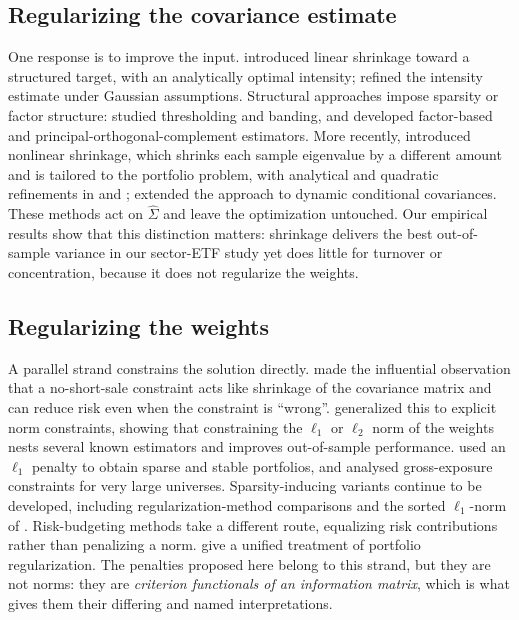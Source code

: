 \documentclass[11pt]{article}
\newcommand{\Sighat}{\hat\Sigma}
\begin{document}
\subsection{Regularizing the covariance estimate}
One response is to improve the input. \citet{ledoitwolf2003,ledoitwolf2004}
introduced linear shrinkage toward a structured target, with an analytically
optimal intensity; \citet{chen2010oas} refined the intensity estimate under
Gaussian assumptions. Structural approaches impose sparsity or factor structure:
\citet{bickel2008} studied thresholding and banding, \citet{fan2008} and
\citet{fan2013} developed factor-based and principal-orthogonal-complement
estimators. More recently, \citet{ledoitwolf2017} introduced nonlinear shrinkage,
which shrinks each sample eigenvalue by a different amount and is tailored to the
portfolio problem, with analytical and quadratic refinements in
\citet{ledoitwolf2020} and \citet{ledoitwolf2022}; \citet{engle2019} extended the
approach to dynamic conditional covariances. These methods act on $\Sighat$ and
leave the optimization untouched. Our empirical results show that this
distinction matters: shrinkage delivers the best out-of-sample variance in our
sector-ETF study yet does little for turnover or concentration, because it does
not regularize the weights.

\subsection{Regularizing the weights}
A parallel strand constrains the solution directly. \citet{jagannathan2003} made
the influential observation that a no-short-sale constraint acts like shrinkage
of the covariance matrix and can reduce risk even when the constraint is
``wrong''. \citet{demiguel2009norm} generalized this to explicit norm
constraints, showing that constraining the $\ell_1$ or $\ell_2$ norm of the
weights nests several known estimators and improves out-of-sample performance.
\citet{brodie2009} used an $\ell_1$ penalty to obtain sparse and stable
portfolios, and \citet{fan2012} analysed gross-exposure constraints for very
large universes. Sparsity-inducing variants continue to be developed, including
regularization-method comparisons \citep{fastrich2015} and the sorted
$\ell_1$-norm of \citet{kremer2020}. Risk-budgeting methods
\citep{maillard2010,roncalli2013} take a different route, equalizing risk
contributions rather than penalizing a norm. \citet{bruder2013} give a unified
treatment of portfolio regularization. The penalties proposed here belong to
this strand, but they are not norms: they are \emph{criterion functionals of an
information matrix}, which is what gives them their differing and named
interpretations.
\end{document}
